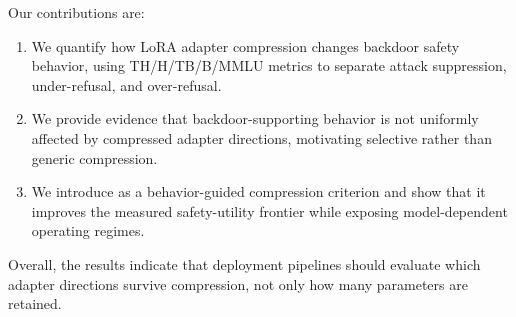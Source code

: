 Our contributions are:
\begin{enumerate}[leftmargin=*,nosep]
    \item We quantify how LoRA adapter compression changes backdoor safety behavior, using TH/H/TB/B/MMLU metrics to separate attack suppression, under-refusal, and over-refusal.
    \item We provide evidence that backdoor-supporting behavior is not uniformly affected by compressed adapter directions, motivating selective rather than generic compression.
    \item We introduce \sac{} as a behavior-guided compression criterion and show that it improves the measured safety-utility frontier while exposing model-dependent operating regimes.
\end{enumerate}

Overall, the results indicate that deployment pipelines should evaluate which adapter directions survive compression, not only how many parameters are retained.

